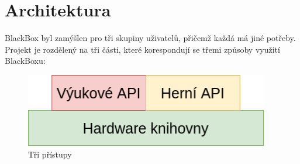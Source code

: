 \chapter{Architektura}

BlackBox byl zamýšlen pro tři skupiny uživatelů, přičemž každá má jiné potřeby.
Projekt je rozdělený na tři části, které korespondují se třemi způsoby využití BlackBoxu:

\begin{figure}[h]
    \begin{small}
        \begin{center}
            \includegraphics[width=0.95\textwidth]{img/Pyramida2.png}
        \end{center}
        \caption{Tři přístupy}
        \label{fig:Pyramida2}
    \end{small}
\end{figure}



